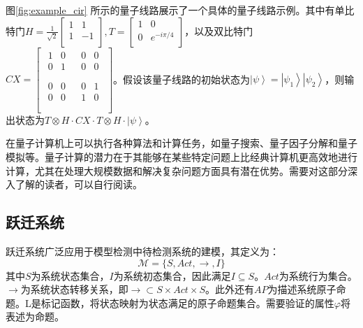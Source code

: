 图\ref{fig:example_cir} 所示的量子线路展示了一个具体的量子线路示例。其中有单比特门\(H=\frac{1}{\sqrt2}\left[\begin{matrix}1&1\\1&-1\\\end{matrix}\right],T=\left[\begin{matrix}1&0\\0&e^{-i\pi/4}\\\end{matrix}\right]\)，以及双比特门\(CX=\left[\begin{matrix}\begin{matrix}1&0\\0&1\\\end{matrix}&\begin{matrix}0&0\\0&0\\\end{matrix}\\\begin{matrix}0&0\\0&0\\\end{matrix}&\begin{matrix}0&1\\1&0\\\end{matrix}\\\end{matrix}\right]\)。假设该量子线路的初始状态为\(\left|\psi\right\rangle=\left|\psi_1\right\rangle\left|\psi_2\right\rangle\)，则输出状态为\(T\otimes H\cdot CX\cdot T\otimes H\cdot\left|\psi\right\rangle\)。

在量子计算机上可以执行各种算法和计算任务，如量子搜索\citep{Grover_1996}、量子因子分解\citep{shor}和量子模拟\citep{Feynman}等。量子计算的潜力在于其能够在某些特定问题上比经典计算机更高效地进行计算，尤其在处理大规模数据和解决复杂问题方面具有潜在优势。需要对这部分深入了解的读者，可以自行阅读\citep{nielsen2010quantum}。
\subsection{跃迁系统}
跃迁系统广泛应用于模型检测中待检测系统的建模，其定义为\citep{baier2008principles}：
\begin{equation}
\mathcal{M}=\{S,Act,\rightarrow,I\}
\end{equation}
其中\(S\)为系统状态集合，\(I\)为系统初态集合，因此满足\(I\subseteq S\)。\(Act\)为系统行为集合。\(\rightarrow\)为系统状态转移关系，即\(\rightarrow\subset S\times Act\times S\)。此外还有\(AP\)为描述系统原子命题。L是标记函数，将状态映射为状态满足的原子命题集合。需要验证的属性\(\varphi\)将表述为命题。


